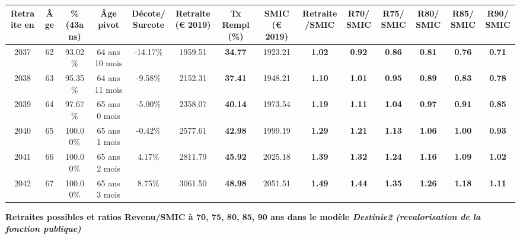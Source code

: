 \begin{adjustbox}{max width=\textwidth} 
\begin{tabular}[htb]{|c|c||c|c|c||c|c||c|c||c|c|c|c|c|} 
\hline 
 Retraite en &  Âge &  \%(43ans) &  Âge pivot &  Décote/Surcote &  Retraite (\euro{} 2019) &  Tx Rempl(\%) &  SMIC (\euro{} 2019) &  Retraite/SMIC &  R70/SMIC &  R75/SMIC &  R80/SMIC &  R85/SMIC &  R90/SMIC \\ 
\hline \hline 
 2037 &  62 &  93.02\% &  64 ans 10 mois &  -14.17\% &  1959.51 &  {\bf 34.77} &  1923.21 &  {\bf 1.02} &  {\bf {\color{red} 0.92}} &  {\bf {\color{red} 0.86}} &  {\bf {\color{red} 0.81}} &  {\bf {\color{red} 0.76}} &  {\bf {\color{red} 0.71}} \\ 
\hline 
 2038 &  63 &  95.35\% &  64 ans 11 mois &  -9.58\% &  2152.31 &  {\bf 37.41} &  1948.21 &  {\bf 1.10} &  {\bf 1.01} &  {\bf {\color{red} 0.95}} &  {\bf {\color{red} 0.89}} &  {\bf {\color{red} 0.83}} &  {\bf {\color{red} 0.78}} \\ 
\hline 
 2039 &  64 &  97.67\% &  65 ans 0 mois &  -5.00\% &  2358.07 &  {\bf 40.14} &  1973.54 &  {\bf 1.19} &  {\bf 1.11} &  {\bf 1.04} &  {\bf {\color{red} 0.97}} &  {\bf {\color{red} 0.91}} &  {\bf {\color{red} 0.85}} \\ 
\hline 
 2040 &  65 &  100.00\% &  65 ans 1 mois &  -0.42\% &  2577.61 &  {\bf 42.98} &  1999.19 &  {\bf 1.29} &  {\bf 1.21} &  {\bf 1.13} &  {\bf 1.06} &  {\bf {\color{red} 1.00}} &  {\bf {\color{red} 0.93}} \\ 
\hline 
 2041 &  66 &  100.00\% &  65 ans 2 mois &  4.17\% &  2811.79 &  {\bf 45.92} &  2025.18 &  {\bf 1.39} &  {\bf 1.32} &  {\bf 1.24} &  {\bf 1.16} &  {\bf 1.09} &  {\bf 1.02} \\ 
\hline 
 2042 &  67 &  100.00\% &  65 ans 3 mois &  8.75\% &  3061.50 &  {\bf 48.98} &  2051.51 &  {\bf 1.49} &  {\bf 1.44} &  {\bf 1.35} &  {\bf 1.26} &  {\bf 1.18} &  {\bf 1.11} \\ 
\hline 
\hline 
\end{tabular} 
\end{adjustbox} 
 
 \vspace{0.1cm} 
{\bf \noindent Retraites possibles et ratios Revenu/SMIC à 70, 75, 80, 85, 90 ans dans le modèle \emph{Destinie2 (revalorisation de la fonction publique)}}  
 
